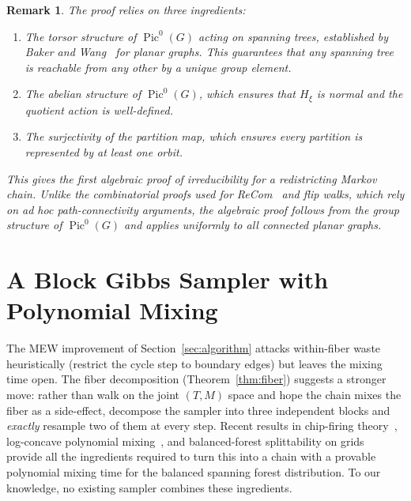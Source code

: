\documentclass[11pt]{article}
\newtheorem{remark}{Remark}[section]
\newcommand{\Pic}{\operatorname{Pic}^0}
\begin{document}
\begin{remark}
The proof relies on three ingredients:
\begin{enumerate}
  \item The \emph{torsor structure} of $\Pic(G)$ acting on spanning trees,
    established by Baker and Wang~\cite{baker2018bernardi} for planar graphs.
    This guarantees that any spanning tree is reachable from any other by a
    unique group element.
  \item The \emph{abelian} structure of $\Pic(G)$, which ensures that
    $H_\xi$ is normal and the quotient action is well-defined.
  \item The \emph{surjectivity} of the partition map, which ensures every
    partition is represented by at least one orbit.
\end{enumerate}
This gives the first algebraic proof of irreducibility for a redistricting
Markov chain. Unlike the combinatorial proofs used for ReCom~\cite{deford2021recombination} and
flip walks, which rely on ad hoc path-connectivity arguments, the algebraic
proof follows from the group structure of $\Pic(G)$ and applies uniformly to
all connected planar graphs.
\end{remark}



\section{A Block Gibbs Sampler with Polynomial Mixing}\label{sec:block-gibbs}

The MEW improvement of Section~\ref{sec:algorithm} attacks within-fiber waste
heuristically (restrict the cycle step to boundary edges) but leaves the
mixing time open. The fiber decomposition (Theorem~\ref{thm:fiber}) suggests
a stronger move: rather than walk on the joint $(T,M)$ space and hope the
chain mixes the fiber as a side-effect, decompose the sampler into three
independent blocks and \emph{exactly} resample two of them at every step.
Recent results in chip-firing
theory~\cite{corry2018divisors}, log-concave polynomial
mixing~\cite{anari2021logconcave,charikar2023complexity}, and balanced-forest
splittability on grids~\cite{cannon2024sampling,gillman2025splittable,akitaya2026bud}
provide all the ingredients required to turn this into a chain with a
provable polynomial mixing time for the balanced spanning forest
distribution. To our knowledge, no existing sampler combines these
ingredients.
\end{document}
